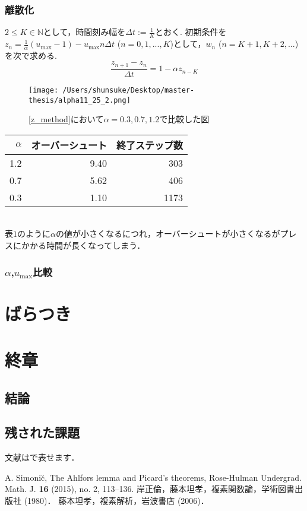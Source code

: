 \documentclass [dvipdfmx] {jsarticle}
\numberwithin{equation}{section}
\theoremstyle{definition} %
\theoremstyle{definition} %
\begin{document}
\subsubsection{離散化}
$2\le K\in\mathbb{N}$として，時間刻み幅を$\Delta t:=\frac{1}{K}$とおく.
初期条件を$z_n=\frac{1}{\alpha} (u_{\max}-1)-u_{\max} n \Delta t$ ($n=0,1,...,K$)として，$w_n$ ($n=K+1,K+2,...$)
を次で求める.
\begin{equation}\label{z_method}
    \displaystyle\frac{z_{n+1}-z_n}{\Delta t}=1-\alpha z_{n-K}
\end{equation}
\begin{figure}[htbp]
\begin{center}
\texttt{[image: /Users/shunsuke/Desktop/master-thesis/alpha11\_25\_2.png]}
\caption{\eqref{z_method}において$\alpha=0.3,0.7,1.2$で比較した図}
\end{center}
\end{figure}
\begin{table}[h]
    \label{table:colortbl}
    \centering
    \begin{tabular}{|r|r|r|}
     \hline
     $\alpha$ & オーバーシュート & 終了ステップ数  \\
     \hline\hline
     1.2 & 9.40 & 303 \\
     0.7 & 5.62 & 406 \\
     0.3 & 1.10 & 1173\\
     \hline
    \end{tabular}
  \end{table}
\\  
表$1$のように$\alpha$の値が小さくなるにつれ，オーバーシュートが小さくなるがプレスにかかる時間が長くなってしまう．


\subsubsection{$\alpha$,$u_{\max}$比較}

\section{ばらつき}
\section{終章}
\subsection{結論}
\subsection{残された課題}
文献は\cite{Si}で表せます．
\begin{thebibliography}{9}
 A. Simoni\u{c}, The Ahlfors lemma and Picard's theorems, 
Rose-Hulman Undergrad. Math. J. {\bf 16} (2015), no. 2, 113--136. 
 岸正倫，藤本坦孝，複素関数論，学術図書出版社 (1980)．
 藤本坦孝，複素解析，岩波書店 (2006)．


\end{thebibliography}
\end{document}
